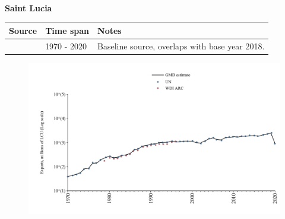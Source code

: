 \documentclass[12pt,a4paper,landscape]{article}
\begin{document}
\begin{adjustbox}{max totalsize={\paperwidth}{\paperheight},center}
\begin{minipage}[t][\textheight][t]{\textwidth}
\vspace*{0.5cm}
{}
\begin{center}
{\Large\bfseries Saint Lucia}
\end{center}
\vspace{0.5cm}
\begin{table}[H]
\centering
\small
\begin{tabular}{|l|l|l|}
\hline
\textbf{Source} & \textbf{Time span} & \textbf{Notes} \\
\hline
\rowcolor{white}\cite{UN}& 1970 - 2020 &Baseline source, overlaps with base year 2018.\\
\hline
\end{tabular}
\end{table}
\begin{figure}[H]
\centering
\includegraphics[width=\textwidth,height=0.6\textheight,keepaspectratio]{graphs/LCA_exports.pdf}
\end{figure}
\end{minipage}
\end{adjustbox}
\end{document}
